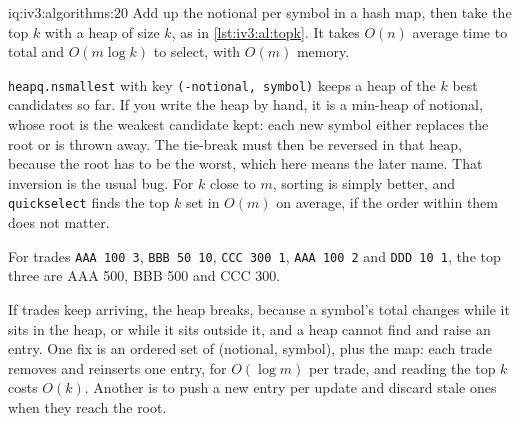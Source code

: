 \begin{solution}{iq:iv3:algorithms:20}
Add up the notional per symbol in a hash map, then take the top $k$ with a heap of size $k$, as in \cref{lst:iv3:al:topk}. It takes $O(n)$ average time to total and $O(m \log k)$ to select, with $O(m)$ memory.
\label{lst:iv3:al:topk}

\texttt{heapq.nsmallest} with key \texttt{(-notional, symbol)} keeps a heap of the $k$ best candidates so far. If you write the heap by hand, it is a min-heap of notional, whose root is the weakest candidate kept: each new symbol either replaces the root or is thrown away. The tie-break must then be reversed in that heap, because the root has to be the worst, which here means the later name. That inversion is the usual bug. For $k$ close to $m$, sorting is simply better, and \texttt{quickselect} finds the top $k$ set in $O(m)$ on average, if the order within them does not matter.

For trades \texttt{AAA 100 3}, \texttt{BBB 50 10}, \texttt{CCC 300 1}, \texttt{AAA 100 2} and \texttt{DDD 10 1}, the top three are AAA 500, BBB 500 and CCC 300.

If trades keep arriving, the heap breaks, because a symbol's total changes while it sits in the heap, or while it sits outside it, and a heap cannot find and raise an entry. One fix is an ordered set of (notional, symbol), plus the map: each trade removes and reinserts one entry, for $O(\log m)$ per trade, and reading the top $k$ costs $O(k)$. Another is to push a new entry per update and discard stale ones when they reach the root.

\end{solution}

